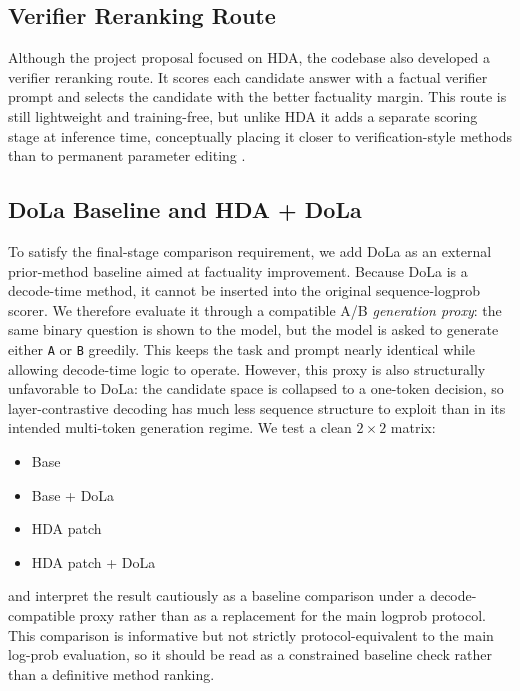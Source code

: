 \documentclass{article}
\begin{document}
\subsection{Verifier Reranking Route}
Although the project proposal focused on HDA, the codebase also developed a verifier reranking route. It scores each candidate answer with a factual verifier prompt and selects the candidate with the better factuality margin. This route is still lightweight and training-free, but unlike HDA it adds a separate scoring stage at inference time, conceptually placing it closer to verification-style methods than to permanent parameter editing \citep{manakul-etal-2023-selfcheckgpt}.

\subsection{DoLa Baseline and HDA + DoLa}
To satisfy the final-stage comparison requirement, we add DoLa as an external prior-method baseline aimed at factuality improvement. Because DoLa is a decode-time method, it cannot be inserted into the original sequence-logprob scorer. We therefore evaluate it through a compatible A/B \emph{generation proxy}: the same binary question is shown to the model, but the model is asked to generate either \texttt{A} or \texttt{B} greedily. This keeps the task and prompt nearly identical while allowing decode-time logic to operate. However, this proxy is also structurally unfavorable to DoLa: the candidate space is collapsed to a one-token decision, so layer-contrastive decoding has much less sequence structure to exploit than in its intended multi-token generation regime. We test a clean $2 \times 2$ matrix:
\begin{itemize}
\item Base
\item Base + DoLa
\item HDA patch
\item HDA patch + DoLa
\end{itemize}
and interpret the result cautiously as a baseline comparison under a decode-compatible proxy rather than as a replacement for the main logprob protocol. This comparison is informative but not strictly protocol-equivalent to the main log-prob evaluation, so it should be read as a constrained baseline check rather than a definitive method ranking.
\end{document}
